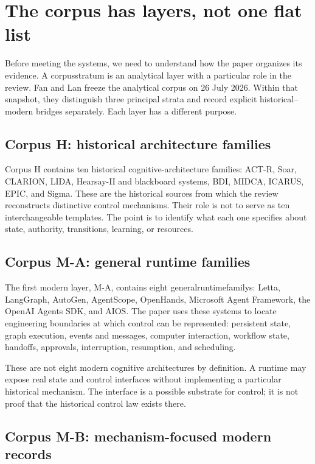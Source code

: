 \section{The corpus has layers, not one flat list}
\label{sec:ch11-corpus-layers}

Before meeting the systems, we need to understand how the paper organizes its evidence. A \gls{corpusstratum} is an analytical layer with a particular role in the review. Fan and Lan freeze the analytical corpus on 26 July 2026. Within that snapshot, they distinguish three principal strata and record explicit historical--modern bridges separately. Each layer has a different purpose.

\subsection{Corpus H: historical architecture families}

Corpus H contains ten historical cognitive-architecture families: ACT-R, Soar, CLARION, LIDA, Hearsay-II and blackboard systems, BDI, MIDCA, ICARUS, EPIC, and Sigma. These are the historical sources from which the review reconstructs distinctive control mechanisms. Their role is not to serve as ten interchangeable templates. The point is to identify what each one specifies about state, authority, transitions, learning, or resources.

\subsection{Corpus M-A: general runtime families}

The first modern layer, M-A, contains eight \glspl{generalruntimefamily}: Letta, LangGraph, AutoGen, AgentScope, OpenHands, Microsoft Agent Framework, the OpenAI Agents SDK, and AIOS. The paper uses these systems to locate engineering boundaries at which control can be represented: persistent state, graph execution, events and messages, computer interaction, workflow state, handoffs, approvals, interruption, resumption, and scheduling.

These are not eight modern cognitive architectures by definition. A runtime may expose real state and control interfaces without implementing a particular historical mechanism. The interface is a possible substrate for control; it is not proof that the historical control law exists there.

\subsection{Corpus M-B: mechanism-focused modern records}

